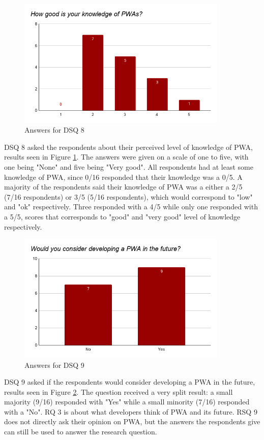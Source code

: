 \documentclass[a4paper,12pt]{article}
\begin{document}
\begin{figure}[ht!]
    \centering
    \includegraphics[width=10cm]{img/Results/dsq8.png}
    \caption{Answers for DSQ 8}
    \label{fig:res_devq8}
\end{figure}

DSQ 8 asked the respondents about their perceived level of knowledge of PWA, results seen in Figure \ref{fig:res_devq8}. The answers were given on a scale of one to five, with one being "None" and five being "Very good". All respondents had at least some knowledge of PWA, since 0/16 responded that their knowledge was a 0/5. A majority of the respondents said their knowledge of PWA was a either a 2/5 (7/16 respondents) or 3/5 (5/16 respondents), which would correspond to "low" and "ok" respectively. Three responded with a 4/5 while only one responded with a 5/5, scores that corresponds to "good" and "very good" level of knowledge respectively.

\begin{figure}[ht!]
    \centering
    \includegraphics[width=10cm]{img/Results/dsq9.png}
    \caption{Answers for DSQ 9}
    \label{fig:res_devq9}
\end{figure}

DSQ 9 asked if the respondents would consider developing a PWA in the future, results seen in Figure \ref{fig:res_devq9}. The question received a very split result: a small majority (9/16) responded with "Yes" while a small minority (7/16) responded with a "No". RQ 3 is about what developers think of PWA and its future. RSQ 9 does not directly ask their opinion on PWA, but the answers the respondents give can still be used to answer the research question.
\end{document}
